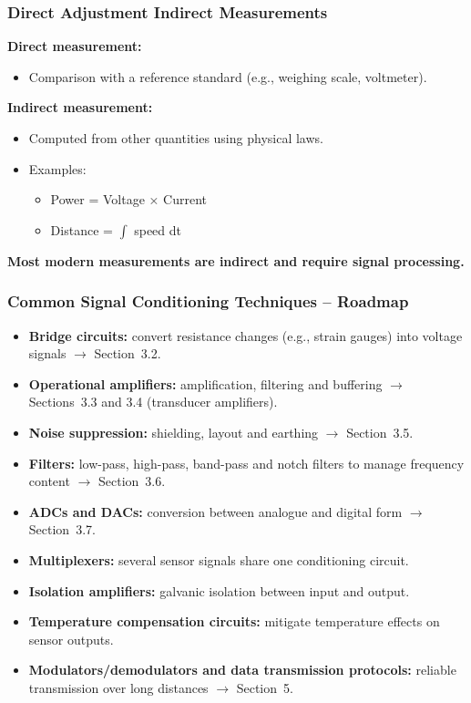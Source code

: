 \begin{frame}
	\frametitle{Direct Adjustment Indirect Measurements}
	\small
	\textbf{Direct measurement:}
	\begin{itemize}
		\item Comparison with a reference standard (e.g., weighing scale, voltmeter).
	\end{itemize}
	\textbf{Indirect measurement:}
	\begin{itemize}
		\item Computed from other quantities using physical laws.
		\item Examples:
		\begin{itemize}
			\item Power = Voltage × Current
			\item Distance = $\int$ speed dt
		\end{itemize}
	\end{itemize}
	\vspace{4pt}
	\textbf{Most modern measurements are indirect and require signal processing.}
\end{frame}
\begin{frame}
	\frametitle{Common Signal Conditioning Techniques -- Roadmap}
	\begin{itemize}
		\item \textbf{Bridge circuits:} convert resistance changes (e.g., strain gauges) into voltage signals $\rightarrow$ Section~3.2.
		\item \textbf{Operational amplifiers:} amplification, filtering and buffering $\rightarrow$ Sections~3.3 and 3.4 (transducer amplifiers).
		\item \textbf{Noise suppression:} shielding, layout and earthing $\rightarrow$ Section~3.5.
		\item \textbf{Filters:} low-pass, high-pass, band-pass and notch filters to manage frequency content $\rightarrow$ Section~3.6.
		\item \textbf{ADCs and DACs:} conversion between analogue and digital form $\rightarrow$ Section~3.7.
		\item \textbf{Multiplexers:} several sensor signals share one conditioning circuit.
		\item \textbf{Isolation amplifiers:} galvanic isolation between input and output.
		\item \textbf{Temperature compensation circuits:} mitigate temperature effects on sensor outputs.
		\item \textbf{Modulators/demodulators and data transmission protocols:} reliable transmission over long distances $\rightarrow$ Section~5.
	\end{itemize}
\end{frame}

